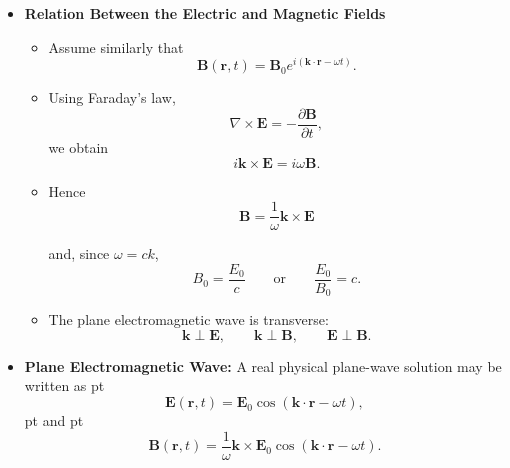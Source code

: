 \documentclass[t,aspectratio=169]{beamer}
\newcommand{\E}{\mathbf{E}}
\newcommand{\B}{\mathbf{B}}
\newcommand{\kvec}{\mathbf{k}}
\begin{document}
\begin{frame}
\begin{itemize}
\begin{itemize}
\pagebreak
\item Plane-wave solutions satisfy
$$ \E\perp\B\perp\kvec,\qquad B_0=\frac{E_0}{c}.$$
\end{itemize}

\pagebreak
\item \textbf{Relation Between the Electric and Magnetic Fields}
\begin{itemize}
\item Assume similarly that
$$\mathbf B(\mathbf r,t)=\mathbf B_0e^{i(\mathbf k\cdot \mathbf r-\omega t)}.$$

\item Using Faraday's law,
$$\nabla\times \mathbf E=-\frac{\partial \mathbf B}{\partial t},$$
we obtain
$$i\mathbf k\times \mathbf E=i\omega \mathbf B.$$

\item Hence
  $$\boxed{\mathbf B=\frac{1}{\omega}\mathbf k\times \mathbf E}$$

\pagebreak
and, since \(\omega=ck\),
$$\boxed{B_0=\frac{E_0}{c}}\qquad\text{or}\qquad\boxed{\frac{E_0}{B_0}=c.}$$

\item The plane electromagnetic wave is transverse:
$$\boxed{\mathbf k\perp \mathbf E,\qquad\mathbf k\perp \mathbf B,\qquad\mathbf E\perp \mathbf B.}$$
\end{itemize}

\pagebreak
\item \textbf{Plane Electromagnetic Wave:} A real physical plane-wave solution may be written as
 pt
$$\mathbf E(\mathbf r,t)=\mathbf E_0 \cos(\mathbf k\cdot\mathbf r-\omega t),$$
 pt
and
 pt
$$\mathbf B(\mathbf r,t)=\frac{1}{\omega}\mathbf k\times \mathbf E_0\cos(\mathbf k\cdot\mathbf r-\omega t).$$

\begin{center}
\end{center}
\end{itemize}
\end{frame}
\end{document}
